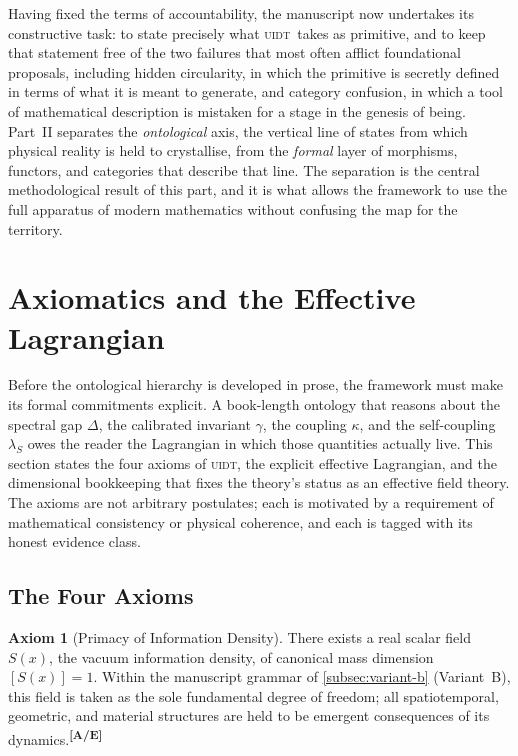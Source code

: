 \documentclass[12pt,a4paper,twoside]{article}
\theoremstyle{plain}
\theoremstyle{definition}
\newtheorem{axiom}{Axiom}
\theoremstyle{remark}
\newcommand{\UIDT}{\textsc{uidt}}
\newcommand{\catmark}[1]{\textsuperscript{\textsf{\textbf{[#1]}}}}
\newcommand{\Sx}{S(x)}
\begin{document}
\noindent Having fixed the terms of accountability, the manuscript now undertakes its constructive task: to state precisely what \UIDT\ takes as primitive, and to keep that statement free of the two failures that most often afflict foundational proposals, including hidden circularity, in which the primitive is secretly defined in terms of what it is meant to generate, and category confusion, in which a tool of mathematical description is mistaken for a stage in the genesis of being. Part~II separates the \emph{ontological} axis, the vertical line of states from which physical reality is held to crystallise, from the \emph{formal} layer of morphisms, functors, and categories that describe that line. The separation is the central methodological result of this part, and it is what allows the framework to use the full apparatus of modern mathematics without confusing the map for the territory.

\section{Axiomatics and the Effective Lagrangian}
\label{sec:axiomatics}

\noindent Before the ontological hierarchy is developed in prose, the framework must make its formal commitments explicit. A book-length ontology that reasons about the spectral gap $\Delta$, the calibrated invariant $\gamma$, the coupling $\kappa$, and the self-coupling $\lambda_S$ owes the reader the Lagrangian in which those quantities actually live. This section states the four axioms of \UIDT, the explicit effective Lagrangian, and the dimensional bookkeeping that fixes the theory's status as an effective field theory. The axioms are not arbitrary postulates; each is motivated by a requirement of mathematical consistency or physical coherence, and each is tagged with its honest evidence class.

\subsection{The Four Axioms}
\label{subsec:four-axioms}

\begin{axiom}[Primacy of Information Density]
\label{ax:primacy}
There exists a real scalar field $\Sx$, the vacuum information density, of canonical mass dimension $[\Sx]=1$. Within the manuscript grammar of \cref{subsec:variant-b} (Variant~B), this field is taken as the sole fundamental degree of freedom; all spatiotemporal, geometric, and material structures are held to be emergent consequences of its dynamics.\catmark{A/E}
\end{axiom}
\end{document}
